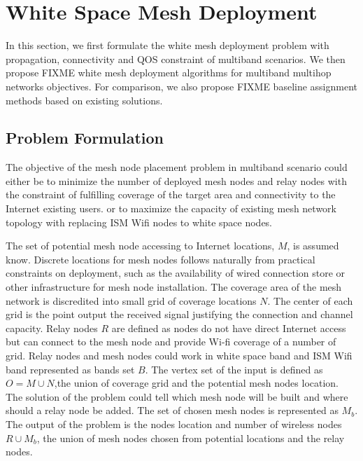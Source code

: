 \section{White Space Mesh Deployment}
\label{sec:model}

In this section, we first formulate the 
white mesh deployment problem
with propagation, connectivity and QOS constraint of multiband scenarios.
We then propose {FIXME} white mesh deployment algorithms for multiband multihop networks objectives.
For comparison, we also propose {FIXME} baseline assignment methods based on existing solutions.

\subsection{Problem Formulation}
The objective of the mesh node placement problem in multiband scenario could either be 
to minimize the number of deployed mesh nodes and relay nodes with the constraint of fulfilling coverage of the target area and connectivity to the Internet existing users. 
or to maximize the capacity of existing mesh network topology with replacing ISM Wifi nodes to white space nodes.

The set of potential mesh node accessing to Internet locations, $M$, is assumed know. 
Discrete locations for mesh nodes follows naturally from practical constraints on deployment, such as the availability of wired connection store or other infrastructure for mesh node installation.
The coverage area of the mesh network is discredited into small grid of coverage locations $N$. The center of each grid is the point output the received signal justifying the connection and channel capacity.
Relay nodes $R$  are defined as nodes do not have direct Internet access but can connect to the mesh node and provide Wi-fi coverage of a number of grid.
Relay nodes and mesh nodes could work in white space band and ISM Wifi band represented as bands set $B$.
The vertex set of the input is defined as $O=M\cup N$,the union of  coverage grid and the potential mesh nodes location. 
The solution of the problem could tell which mesh node will be built and where should a relay node be added. The set of chosen mesh nodes is represented as $M_b$. 
The output of the problem is the nodes location and number of wireless nodes $R\cup M_b$, the union of mesh nodes chosen from potential locations and the relay nodes. 


